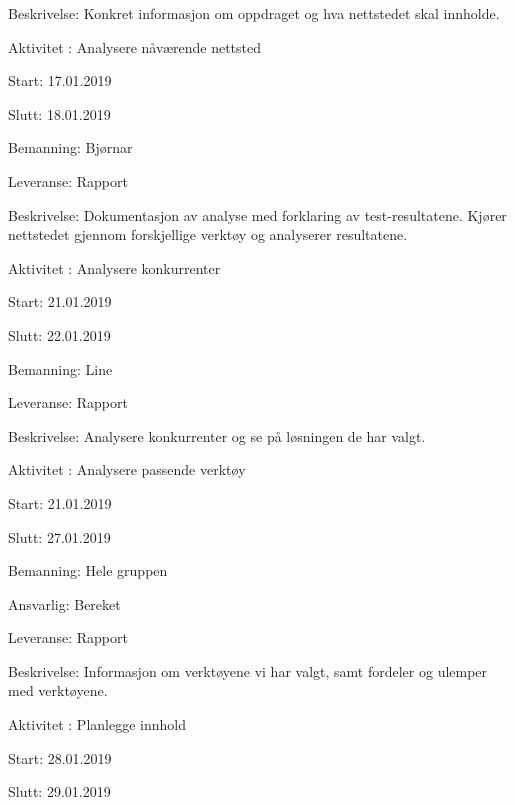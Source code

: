 \documentclass[11pt,a4paper]{report}
\begin{document}
\begin{compactdesc}
\begin{compactitem}
	\item Beskrivelse: Konkret informasjon om oppdraget og hva nettstedet skal innholde.
	\addtocounter{aktivitetTeller}{1}
	\end{compactitem}
	\item [Aktivitet \arabic{aktivitetTeller}:] Analysere nåværende nettsted
	\begin{compactitem}
	\item Start: 17.01.2019
	\item Slutt: 18.01.2019
	\item Bemanning: Bjørnar
	\item Leveranse: Rapport
	\item Beskrivelse: Dokumentasjon av analyse med forklaring av test-resultatene. Kjører nettstedet gjennom forskjellige verktøy og analyserer resultatene.
	\addtocounter{aktivitetTeller}{1}
	\end{compactitem}
	\item [Aktivitet \arabic{aktivitetTeller}:] Analysere konkurrenter
	\begin{compactitem}
	\item Start: 21.01.2019
	\item Slutt: 22.01.2019
	\item Bemanning: Line
	\item Leveranse: Rapport
	\item Beskrivelse: Analysere konkurrenter og se på løsningen de har valgt.
	\addtocounter{aktivitetTeller}{1}
	\end{compactitem}
	\item [Aktivitet \arabic{aktivitetTeller}:] Analysere passende verktøy
	\begin{compactitem}
	\item Start: 21.01.2019
	\item Slutt: 27.01.2019
	\item Bemanning: Hele gruppen
	\item Ansvarlig: Bereket
	\item Leveranse: Rapport
	\item Beskrivelse: Informasjon om verktøyene vi har valgt, samt fordeler og ulemper med verktøyene.
	\addtocounter{aktivitetTeller}{1}
	\end{compactitem}
	\item [Aktivitet \arabic{aktivitetTeller}:] Planlegge innhold
	\begin{compactitem}
	\item Start: 28.01.2019
	\item Slutt: 29.01.2019

\end{compactitem}
\end{compactdesc}
\end{document}

